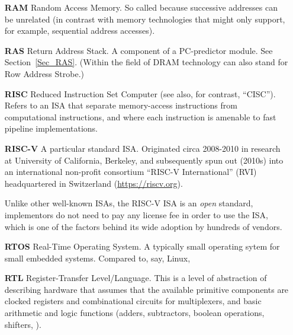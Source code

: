 \begin{itemize}
\item[\bf RAM] Random Access Memory.  So called because successive
  addresses can be unrelated (in contrast with memory technologies
  that might only support, for example, sequential address accesses).

\item[\bf RAS] Return Address Stack.  A component of a PC-predictor
  module.  See Section~\ref{Sec_RAS}.  (Within the field of DRAM
  technology can also stand for Row Address Strobe.)

\item[\bf RISC] Reduced Instruction Set Computer (see also, for
  contrast, ``CISC'').  Refers to an ISA that separate memory-access
  instructions from computational instructions, and where each
  instruction is amenable to fast pipeline implementations.

\item[\bf RISC-V] A particular standard ISA.  Originated circa
  2008-2010 in research at University of California, Berkeley, and
  subsequently spun out (2010s) into an international non-profit
  consortium ``RISC-V International'' (RVI) headquartered in
  Switzerland (\url{https://riscv.org}).

  Unlike other well-known ISAs, the RISC-V ISA is an \emph{open}
  standard, {\ie} implementors do not need to pay any license fee in
  order to use the ISA, which is one of the factors behind its wide
  adoption by hundreds of vendors.

\item[\bf RTOS] Real-Time Operating System.  A typically small
  operating sytem for small embedded systems.  Compared to, say,
  Linux,

\item[\bf RTL] Register-Transfer Level/Language.  This is a level of
  abstraction of describing hardware that assumes that the available
  primitive components are clocked registers and combinational
  circuits for multiplexers, and basic arithmetic and logic functions
  (adders, subtractors, boolean operations, shifters, {\etc}).


\end{itemize}
